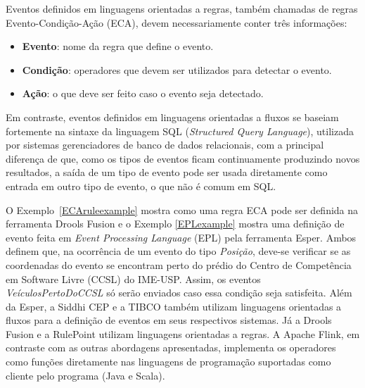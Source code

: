 Eventos definidos em linguagens orientadas a regras, também chamadas de regras Evento-Condição-Ação (ECA), devem necessariamente conter três informações:

\begin{itemize}
\item \textbf{Evento}: nome da regra que define o evento. 
\item \textbf{Condição}: operadores que devem ser utilizados para detectar o evento. 
\item \textbf{Ação}: o que deve ser feito caso o evento seja detectado. 
\end{itemize} 



Em contraste, eventos definidos em linguagens orientadas a fluxos se baseiam fortemente na sintaxe da linguagem SQL (\textit{Structured Query Language}), utilizada por sistemas gerenciadores de banco de dados  relacionais, com a principal diferença de que, como os tipos de eventos ficam continuamente produzindo novos resultados, a saída de um tipo de evento pode ser usada diretamente como entrada em outro tipo de evento, o que não é comum em SQL.




O Exemplo~\ref{ECAruleexample} mostra como uma regra ECA pode ser definida na ferramenta Drools Fusion e o Exemplo \ref{EPLexample} mostra uma definição de evento feita em \textit{Event Processing Language} (EPL) pela ferramenta Esper. Ambos definem que, na ocorrência de um evento do tipo \textit{Posição}, deve-se  verificar se as coordenadas do evento se encontram perto do prédio do Centro de Competência em Software Livre (CCSL) do IME-USP. Assim, os eventos \textit{VeículosPertoDoCCSL} só serão enviados caso essa condição seja satisfeita.
Além da Esper, a Siddhi CEP e a TIBCO também utilizam linguagens orientadas a fluxos para a definição de eventos em seus respectivos sistemas. Já a Drools Fusion e a RulePoint utilizam linguagens orientadas a regras. 
A Apache Flink, em contraste com as outras abordagens apresentadas, implementa os operadores como funções diretamente nas linguagens de programação suportadas como cliente pelo programa (Java e Scala). %



